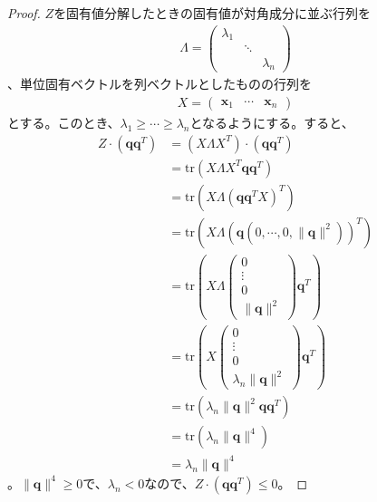 \begin{proof}
  $Z$を固有値分解したときの固有値が対角成分に並ぶ行列を
  \begin{align*}
    \Lambda = \left(
                \begin{array}{ccc}
                  \lambda_1 &        & \\
                            & \ddots & \\
                            &        & \lambda_n
                \end{array}
              \right)
  \end{align*}
  、単位固有ベクトルを列ベクトルとしたものの行列を
  \begin{align*}
    X = \left(
          \begin{array}{ccc}
            \mathbf{x}_1 & \cdots & \mathbf{x}_n
          \end{array}
        \right)
  \end{align*}
  とする。このとき、$\lambda_1 \geq \cdots \geq \lambda_n$となるようにする。すると、
  \begin{align*}
    Z \cdot (\mathbf{q} \mathbf{q}^T) & = (X \Lambda X^T) \cdot (\mathbf{q} \mathbf{q}^T) \\
                                      & = \mathrm{tr}(X \Lambda X^T \mathbf{q} \mathbf{q}^T) \\
                                      & = \mathrm{tr}(X \Lambda (\mathbf{q} \mathbf{q}^T X)^T) \\
                                      & = \mathrm{tr}(X \Lambda (\mathbf{q} \left(0, \cdots, 0, \|\mathbf{q}\|^2\right))^T) \\
                                      & = \mathrm{tr}(X \Lambda \left(\begin{array}{c} 0 \\ \vdots \\ 0 \\ \|\mathbf{q}\|^2 \end{array}\right) \mathbf{q}^T) \\
                                      & = \mathrm{tr}(X \left(\begin{array}{c} 0 \\ \vdots \\ 0 \\ \lambda_n \|\mathbf{q}\|^2 \end{array}\right) \mathbf{q}^T) \\
                                      & = \mathrm{tr}(\lambda_n \|\mathbf{q}\|^2 \mathbf{q} \mathbf{q}^T) \\
                                      & = \mathrm{tr}(\lambda_n \|\mathbf{q}\|^4) \\
                                      & = \lambda_n \|\mathbf{q}\|^4
  \end{align*}
  。$\|\mathbf{q}\|^4 \geq 0$で、$\lambda_n < 0$なので、$Z \cdot (\mathbf{q} \mathbf{q}^T) \leq 0$。
\end{proof}

